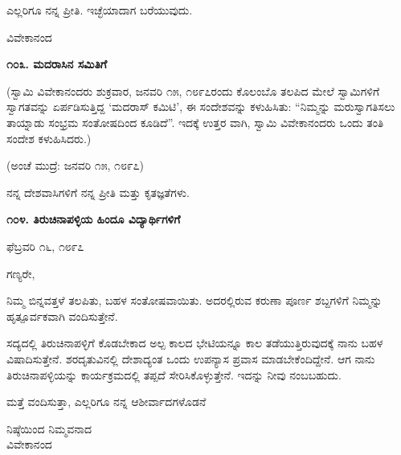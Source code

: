 ಎಲ್ಲರಿಗೂ ನನ್ನ ಪ್ರೀತಿ. ಇಚ್ಛೆಯಾದಾಗ ಬರೆಯುವುದು.

\begin{flushright}
ವಿವೇಕಾನಂದ
\end{flushright}

\begin{center}
\textbf{೧೦೩. ಮದರಾಸಿನ ಸಮಿತಿಗೆ}
\end{center}

\begin{flushright}
(ಸ್ವಾಮಿ ವಿವೇಕಾನಂದರು ಶುಕ್ರವಾರ, ಜನವರಿ ೧೫, ೧೮೯೭ರಂದು ಕೊಲಂಬೊ ತಲಪಿದ ಮೇಲೆ ಸ್ವಾಮಿಗಳಿಗೆ ಸ್ವಾಗತವನ್ನು ಏರ್ಪಡಿಸುತ್ತಿದ್ದ ‘ಮದರಾಸ್ ಕಮಿಟಿ’, ಈ ಸಂದೇಶವನ್ನು ಕಳುಹಿಸಿತು: “ನಿಮ್ಮನ್ನು ಮರುಸ್ವಾಗತಿಸಲು ತಾಯ್ನಾಡು ಸಂಭ್ರಮ ಸಂತೋಷದಿಂದ ಕೂಡಿದೆ”. ಇದಕ್ಕೆ ಉತ್ತರ ವಾಗಿ, ಸ್ವಾಮಿ ವಿವೇಕಾನಂದರು ಒಂದು ತಂತಿ ಸಂದೇಶ ಕಳುಹಿಸಿದರು.)
\end{flushright}

\begin{flushright}
(ಅಂಚೆ ಮುದ್ರೆ: ಜನವರಿ ೧೫, ೧೮೯೭)
\end{flushright}

ನನ್ನ ದೇಶವಾಸಿಗಳಿಗೆ ನನ್ನ ಪ್ರೀತಿ ಮತ್ತು ಕೃತಜ್ಞತೆಗಳು.

\begin{center}
\textbf{೧೦೪. ತಿರುಚಿನಾಪಳ್ಳಿಯ ಹಿಂದೂ ವಿದ್ಯಾರ್ಥಿಗಳಿಗೆ}
\end{center}

\begin{flushright}
ಫೆಬ್ರವರಿ ೧೬, ೧೮೯೭
\end{flushright}

ಗಣ್ಯರೇ,

ನಿಮ್ಮ ಬಿನ್ನವತ್ತಳೆ ತಲಪಿತು, ಬಹಳ ಸಂತೋಷವಾಯಿತು. ಅದರಲ್ಲಿರುವ ಕರುಣಾ ಪೂರ್ಣ ಶಬ್ದಗಳಿಗೆ ನಿಮ್ಮನ್ನು ಹೃತ್ಪೂರ್ವಕವಾಗಿ ವಂದಿಸುತ್ತೇನೆ.

ಸದ್ಯದಲ್ಲಿ ತಿರುಚಿನಾಪಳ್ಳಿಗೆ ಕೊಡಬೇಕಾದ ಅಲ್ಪ ಕಾಲದ ಭೇಟಿಯನ್ನೂ ಕಾಲ ತಡೆಯುತ್ತಿರುವುದಕ್ಕೆ ನಾನು ಬಹಳ ವಿಷಾದಿಸುತ್ತೇನೆ. ಶರದೃತುವಿನಲ್ಲಿ ದೇಶಾದ್ಯಂತ ಒಂದು ಉಪನ್ಯಾಸ ಪ್ರವಾಸ ಮಾಡಬೇಕೆಂದಿದ್ದೇನೆ. ಆಗ ನಾನು ತಿರುಚಿನಾಪಳ್ಳಿಯನ್ನು ಕಾರ್ಯಕ್ರಮದಲ್ಲಿ ತಪ್ಪದೆ ಸೇರಿಸಿಕೊಳ್ಳುತ್ತೇನೆ. ಇದನ್ನು ನೀವು ನಂಬಬಹುದು.

ಮತ್ತೆ ವಂದಿಸುತ್ತಾ, ಎಲ್ಲರಿಗೂ ನನ್ನ ಆಶೀರ್ವಾದಗಳೊಡನೆ

\begin{flushright}
ನಿಷ್ಠೆಯಿಂದ ನಿಮ್ಮವನಾದ\\ವಿವೇಕಾನಂದ
\end{flushright}

